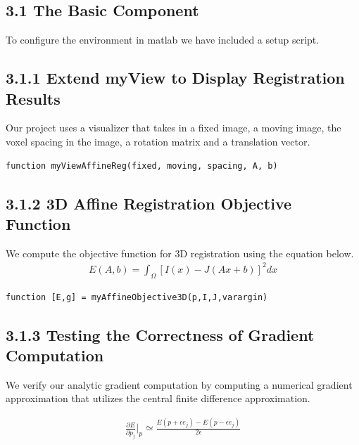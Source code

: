 \documentclass{article}
\begin{document}
	\begin{par}
		\section*{3.1 The Basic Component}
		To configure the environment in matlab we have included a setup script.
		
		
		
		\subsection*{3.1.1 Extend myView to Display Registration Results}
			Our project uses a visualizer that takes in a fixed image, a moving image, the voxel spacing in the image, a rotation matrix and a translation vector. 
			\begin{lstlisting}
function myViewAffineReg(fixed, moving, spacing, A, b)
			\end{lstlisting}
%			
			
		\subsection*{3.1.2 3D Affine Registration Objective Function}
			We compute the objective function for 3D registration using the equation below.
			\begin{align*}
				E(A,b) = \int_{\Omega} [ I(x) - J(Ax+b)]^{2} dx
			\end{align*}

			\begin{lstlisting}
function [E,g] = myAffineObjective3D(p,I,J,varargin)
			\end{lstlisting}
			

		\subsection*{3.1.3 Testing the Correctness of Gradient Computation}
			We verify our analytic gradient computation by computing a numerical gradient approximation that utilizes the central finite difference approximation. 

			\begin{align*}
				\frac{\partial E}{\partial p_{j}} |_{p} \simeq  \frac{E(p + \epsilon e_{j}) - E(p - \epsilon e_{j})}{2 \epsilon}
			\end{align*}


\end{par}
\end{document}
